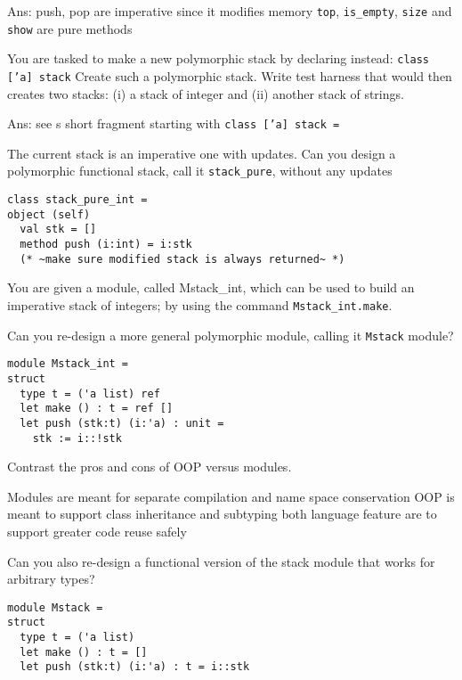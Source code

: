 \documentclass[fontsize=10pt]{slnotes}
\begin{document}
Ans: push, pop are imperative since it modifies memory
\texttt{top}, \texttt{is\_empty}, \texttt{size} and \texttt{show} are pure methods

You are tasked to make a new polymorphic stack by
    declaring instead:
    \texttt{class ['a] stack}
    Create such a polymorphic stack.
    Write test harness that would then creates two stacks:
      (i) a stack of integer and
      (ii) another stack of strings.

   Ans: see s short fragment starting with
       \texttt{class ['a] stack =}

The current stack is an imperative one with updates.
    Can you design a polymorphic functional stack, call
    it \texttt{stack\_pure}, without any updates

\begin{lstlisting}[escapechar=\~,escapebegin=\rmfamily,language={[Objective]Caml}]
class stack_pure_int =
object (self)
  val stk = []
  method push (i:int) = i:stk
  (* ~make sure modified stack is always returned~ *)
\end{lstlisting}

You are given a module, called Mstack\_int, which can be
    used to build an imperative stack of integers; by using
     the command \texttt{Mstack\_int.make}.

    Can you re-design a more general polymorphic module,
    calling it \texttt{Mstack} module?
\begin{lstlisting}[escapechar=\~,escapebegin=\rmfamily,language={[Objective]Caml}]
module Mstack_int =
struct
  type t = ('a list) ref
  let make () : t = ref []
  let push (stk:t) (i:'a) : unit =
    stk := i::!stk
\end{lstlisting}

    Contrast the pros and cons of OOP versus modules.

Modules are meant for separate compilation and name space conservation
OOP is meant to support class inheritance and subtyping
both language feature are to support greater code reuse safely

Can you also re-design a functional version of the
    stack module that works for arbitrary types?

\begin{lstlisting}[escapechar=\~,escapebegin=\rmfamily,language={[Objective]Caml}]
module Mstack =
struct
  type t = ('a list)
  let make () : t = []
  let push (stk:t) (i:'a) : t = i::stk
\end{lstlisting}
\end{document}
